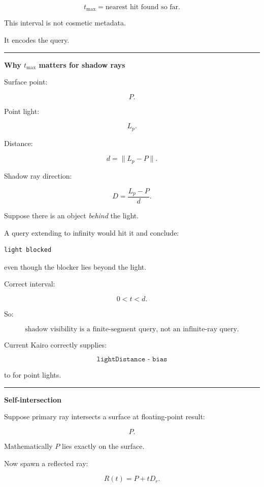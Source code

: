 \[
t_{\max}=
\text{nearest hit found so far}.
\]

This interval is not cosmetic metadata.

It encodes the query.

\begin{center}\rule{0.5\linewidth}{0.5pt}\end{center}

\textbf{Why \(t_{\max}\) matters for shadow rays}

Surface point:

\[
P.
\]

Point light:

\[
L_p.
\]

Distance:

\[
d=
\|L_p-P\|.
\]

Shadow ray direction:

\[
D=
\frac{L_p-P}{d}.
\]

Suppose there is an object \emph{behind} the light.

A query extending to infinity would hit it and conclude:

\begin{verbatim}
light blocked
\end{verbatim}

even though the blocker lies beyond the light.

Correct interval:

\[
0<t<d.
\]

So:

\[
\boxed{
\text{shadow visibility is a finite-segment query, not an infinite-ray query}.
}
\]

Current Kairo correctly supplies:

\[
\texttt{lightDistance - bias}
\]

to  for point lights.

\begin{center}\rule{0.5\linewidth}{0.5pt}\end{center}

\textbf{Self-intersection}

Suppose primary ray intersects a surface at floating-point result:

\[
P.
\]

Mathematically \(P\) lies exactly on the surface.

Now spawn a reflected ray:

\[
R(t)=P+tD_r.
\]

